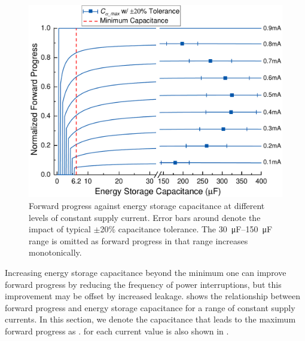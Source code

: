 \begin{figure}
    \centering
    \includegraphics[width=\columnwidth]{ch3_sizingeffect/figures/StorCCur6Fig} 
    \caption{Forward progress against energy storage capacitance at different levels of constant supply current. Error bars around  denote the impact of typical $\pm$20\% capacitance tolerance. The \SIrange{30}{150}{\micro\farad} range is omitted as forward progress in that range increases monotonically. }
    \label{fig:fpwconstcurr}
\end{figure}

Increasing energy storage capacitance beyond the minimum one can improve forward progress by reducing the frequency of power interruptions, but this improvement may be offset by increased leakage. 
 shows the relationship between forward progress and energy storage capacitance for a range of constant supply currents. 
In this section, we denote the capacitance that leads to the maximum forward progress  as . 
 for each current value is also shown in .

